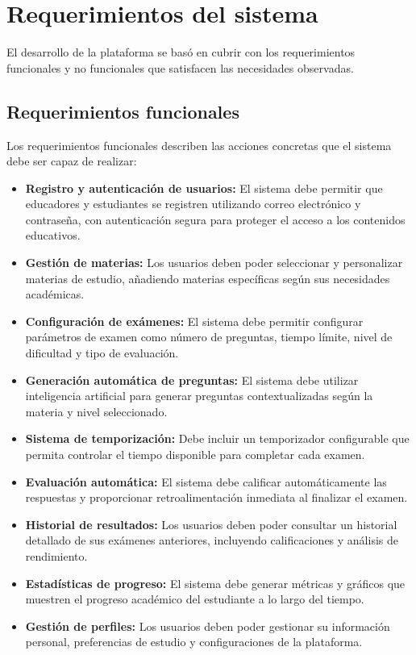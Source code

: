 \documentclass[12pt,a4paper]{report}
\begin{document}
\section{Requerimientos del sistema}

El desarrollo de la plataforma se basó en cubrir con los requerimientos funcionales y no funcionales que satisfacen las necesidades observadas.

\subsection{Requerimientos funcionales}

Los requerimientos funcionales describen las acciones concretas que el sistema debe ser capaz de realizar:

\begin{itemize}
\item \textbf{Registro y autenticación de usuarios:} El sistema debe permitir que educadores y estudiantes se registren utilizando correo electrónico y contraseña, con autenticación segura para proteger el acceso a los contenidos educativos.

\item \textbf{Gestión de materias:} Los usuarios deben poder seleccionar y personalizar materias de estudio, añadiendo materias específicas según sus necesidades académicas.

\item \textbf{Configuración de exámenes:} El sistema debe permitir configurar parámetros de examen como número de preguntas, tiempo límite, nivel de dificultad y tipo de evaluación.

\item \textbf{Generación automática de preguntas:} El sistema debe utilizar inteligencia artificial para generar preguntas contextualizadas según la materia y nivel seleccionado.

\item \textbf{Sistema de temporización:} Debe incluir un temporizador configurable que permita controlar el tiempo disponible para completar cada examen.

\item \textbf{Evaluación automática:} El sistema debe calificar automáticamente las respuestas y proporcionar retroalimentación inmediata al finalizar el examen.

\item \textbf{Historial de resultados:} Los usuarios deben poder consultar un historial detallado de sus exámenes anteriores, incluyendo calificaciones y análisis de rendimiento.

\item \textbf{Estadísticas de progreso:} El sistema debe generar métricas y gráficos que muestren el progreso académico del estudiante a lo largo del tiempo.

\item \textbf{Gestión de perfiles:} Los usuarios deben poder gestionar su información personal, preferencias de estudio y configuraciones de la plataforma.
\end{itemize}
\end{document}
